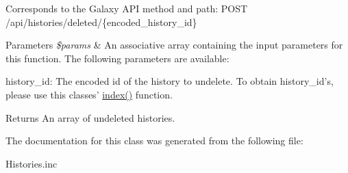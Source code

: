 Corresponds to the Galaxy A\-P\-I method and path\-: P\-O\-S\-T /api/histories/deleted/\{encoded\-\_\-history\-\_\-id\}


\begin{DoxyParams}{Parameters}
{\em \$params} & An associative array containing the input parameters for this function. The following parameters are available\-:\\
\hline
\end{DoxyParams}

\begin{DoxyItemize}
\item history\-\_\-id\-: The encoded id of the history to undelete. To obtain history\-\_\-id's, please use this classes' \hyperlink{classGalaxyHistories_a7b86457598eb1fb0a6c82ef586b8f308}{index()} function.
\end{DoxyItemize}

\begin{DoxyReturn}{Returns}
An array of undeleted histories. 
\end{DoxyReturn}


The documentation for this class was generated from the following file\-:\begin{DoxyCompactItemize}
\item 
Histories.\-inc\end{DoxyCompactItemize}
